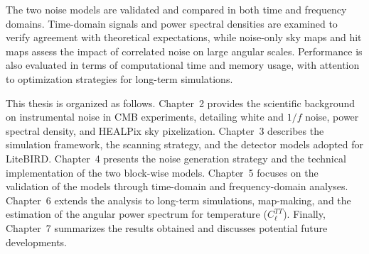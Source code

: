 The two noise models are validated and compared in both time and frequency domains. Time-domain signals and power spectral densities are examined to verify agreement with theoretical expectations, while noise-only sky maps and hit maps assess the impact of correlated noise on large angular scales. Performance is also evaluated in terms of computational time and memory usage, with attention to optimization strategies for long-term simulations.

This thesis is organized as follows. Chapter~2 provides the scientific background on instrumental noise in CMB experiments, detailing white and $1/f$ noise, power spectral density, and HEALPix sky pixelization. Chapter~3 describes the simulation framework, the scanning strategy, and the detector models adopted for LiteBIRD. Chapter~4 presents the noise generation strategy and the technical implementation of the two block-wise models. Chapter~5 focuses on the validation of the models through time-domain and frequency-domain analyses. Chapter~6 extends the analysis to long-term simulations, map-making, and the estimation of the angular power spectrum for temperature ($C_\ell^{TT}$). Finally, Chapter~7 summarizes the results obtained and discusses potential future developments.
